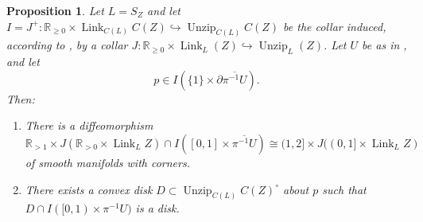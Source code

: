 \documentclass[11pt]{amsart}
\newcommand{\mbb}[1]{\mathbb{#1}}
\newcommand{\R}{\mbb{R}}
\DeclareMathOperator{\Unzip}{Unzip}
\DeclareMathOperator{\Link}{Link}
\numberwithin{equation}{section}
\theoremstyle{definition}
\theoremstyle{remark}
\theoremstyle{plain}
\newtheorem{proposition}[equation]{Proposition}
\begin{document}
\begin{proposition}
    Let $L=S_Z$ and let $I=J^+\colon \R_{\geq0}\times\Link_{C(L)}C(Z)\hookrightarrow\Unzip_{C(L)}C(Z)$ be the collar induced, according to , by a collar $J\colon\R_{\geq0}\times\Link_L(Z)\hookrightarrow \Unzip_L(Z)$. Let $U$ be as in , and let 
    \[
        p\in I(\{1\}\times\partial\overline{\pi^{-1}U}).
    \]
    Then:
    \begin{enumerate} 
        \item There is a diffeomorphism 
        \[
            \R_{>1}\times J(\R_{>0}\times\Link_LZ)\cap I([0,1]\times\overline{\pi^{-1}U})\cong (1,2]\times J((0,1]\times\Link_LZ)
        \]
        of smooth manifolds with corners.
        \item There exists a convex disk $D\subset\Unzip_{C(L)}C(Z)^\circ$ about $p$ such that $D\cap I([0,1)\times\pi^{-1}U)$ is a disk. 
    \end{enumerate}
\end{proposition}
\end{document}

